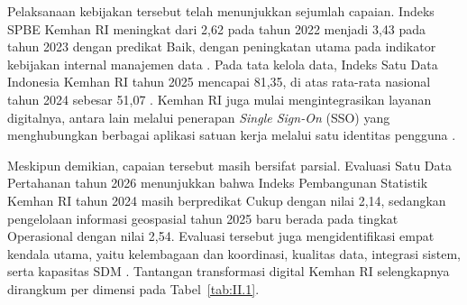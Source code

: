 Pelaksanaan kebijakan tersebut telah menunjukkan sejumlah capaian. Indeks SPBE Kemhan RI meningkat dari 2,62 pada tahun 2022 menjadi 3,43 pada tahun 2023 dengan predikat Baik, dengan peningkatan utama pada indikator kebijakan internal manajemen data \cite{Pusdatin2024}. Pada tata kelola data, Indeks Satu Data Indonesia Kemhan RI tahun 2025 mencapai 81,35, di atas rata-rata nasional tahun 2024 sebesar 51,07 \cite{Pusdatin2026SatuData}. Kemhan RI juga mulai mengintegrasikan layanan digitalnya, antara lain melalui penerapan \textit{Single Sign-On} (SSO) yang menghubungkan berbagai aplikasi satuan kerja melalui satu identitas pengguna \cite{Pusdatin2026SSO}.

Meskipun demikian, capaian tersebut masih bersifat parsial. Evaluasi Satu Data Pertahanan tahun 2026 menunjukkan bahwa Indeks Pembangunan Statistik Kemhan RI tahun 2024 masih berpredikat Cukup dengan nilai 2,14, sedangkan pengelolaan informasi geospasial tahun 2025 baru berada pada tingkat Operasional dengan nilai 2,54. Evaluasi tersebut juga mengidentifikasi empat kendala utama, yaitu kelembagaan dan koordinasi, kualitas data, integrasi sistem, serta kapasitas SDM \cite{Pusdatin2026SatuData}. Tantangan transformasi digital Kemhan RI selengkapnya dirangkum per dimensi pada Tabel~\ref{tab:II.1}.

